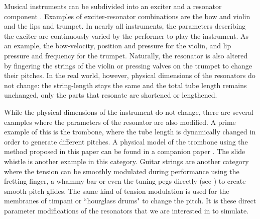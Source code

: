 Musical instruments can be subdivided into an exciter and a resonator component \cite{Borin1989}.  Examples of exciter-resonator combinations are the bow and violin and the lips and trumpet. In nearly all instruments, the parameters describing the exciter are continuously varied by the performer to play the instrument. As an example, the bow-velocity, position and pressure for the violin, and lip pressure and frequency for the trumpet. Naturally, the resonator is also altered by fingering the strings of the violin or pressing valves on the trumpet to change their pitches. In the real world, however, physical dimensions of the resonators do not change: the string-length stays the same and the total tube length remains unchanged, only the parts that resonate are shortened or lengthened.

While the physical dimensions of the instrument do not change, there are several examples where the parameters of the resonator are also modified. A prime example of this is the trombone, where the tube length is dynamically changed in order to generate different pitches. A physical model of the trombone using the method proposed in this paper can be found in a companion paper \cite{Willemsen2021}. The slide whistle is another example in this category. Guitar strings are another category where the tension can be smoothly modulated during performance using the fretting finger, a whammy bar or even the tuning pegs directly (see \cite{Gomm2011}) to create smooth pitch glides. The same kind of tension modulation is used for the membranes of timpani or ``hourglass drums" to change the pitch. %
It is these direct parameter modifications of the resonators that we are interested in to simulate.


